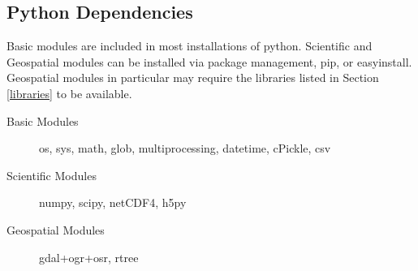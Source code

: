 \documentclass[twoside,a4paper]{refart}
\begin{document}
\subsection{Python Dependencies}\label{python-modules}
Basic modules are included in most installations of python.  Scientific and Geospatial modules can be installed via package management, pip, or easyinstall. Geospatial modules in particular may require the libraries listed in Section \ref{libraries} to be available.
\begin{description}
\item[Basic Modules]
        os, sys, math, glob, multiprocessing, datetime, cPickle, csv

\item[Scientific Modules]
        numpy, scipy, netCDF4, h5py

\item[Geospatial Modules]
        gdal+ogr+osr, rtree
     
\end{description}
\end{document}
